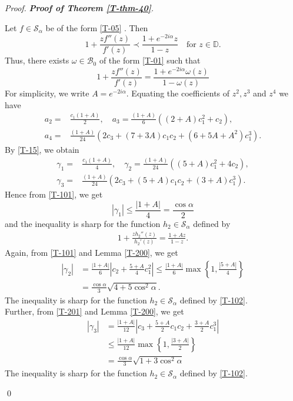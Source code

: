 \documentclass[a4paper,12pt]{amsart}
\theoremstyle{definition}
\newenvironment{pf}[1][]{%
 \vskip 3mm
 \noindent
 \ifthenelse{\equal{#1}{}}%
  {{\slshape Proof. }}%
  {{\slshape #1.} }%
 }%
{\qed\bigskip}
\begin{document}
\begin{pf}[\textbf{Proof of Theorem \ref{T-thm-40}}]
Let $ f \in \mathcal{S}_\alpha $ be of the form \eqref{T-05} . Then
$$
1 + \frac{zf''(z)}{f'(z)} \prec \frac{1+e^{-2i\alpha }z}{1-z} \quad \text{for } z \in \mathbb{D}.
$$  
Thus, there exists $\omega\in\mathcal{B}_0$ of the form \eqref{T-01} such that
$$
1 + \frac{zf''(z)}{f'(z)} =\frac{1+e^{-2i\alpha }\omega(z)}{1-\omega(z)} 
$$  
For simplicity, we write $A=e^{-2i\alpha }$. Equating the coefficients of $z^2,z^3$ and $z^4$ we have
    \begin{align*}
    a_2=&\frac{c_1(1+A)}{2}, \quad a_3=\frac{(1+A)}{6}\left((2+A)c_1^2+c_2\right),\\
    a_4= &\frac{(1+A)}{24}\left(2c_3+(7+3A)c_{1}c_{2}+(6+5A+A^2)c_1^3\right).
    \end{align*}
By \eqref{T-15}, we obtain
\begin{align}
    \gamma_1=&\frac{c_1(1+A)}{4}, \quad \gamma_2=\frac{(1+A)}{24}\left((5+A)c_1^2+4c_2\right),\label{T-101}\\
    \gamma_3= &\frac{(1+A)}{24}\left(2c_3+(5+A)c_{1}c_{2}+(3+A)c_1^3\right).\label{T-201}
    \end{align}
     Hence from \eqref{T-101}, we get
    $$
     |\gamma_1| \leq \frac{|1+A|}{4}= \frac{\cos\alpha}{2}
    $$
    and the inequality is sharp for the function $h_2\in\mathcal{S}_\alpha$ defined by
\begin{align}\label{T-102}
1 + \frac{zh_2''(z)}{h_2'(z)} =  \frac{1+Az}{1-z}.
\end{align}
Again, from \eqref{T-101} and Lemma \ref{T-200}, we get
\begin{align*}
|\gamma_2|
&= \frac{|1+A|}{6} \left|c_2+ \frac{5+A}{4}c_1^2 \right| \le \frac{|1+A|}{6} \max \left\{1, \frac{|5+A|}{4}\right\}\\
& =\frac{\cos\alpha}{3}\sqrt{4+5\cos^2\alpha}.
\end{align*}
The inequality is sharp for the function $h_2\in\mathcal{S}_\alpha$ defined by \eqref{T-102}.\\

Further, from \eqref{T-201} and Lemma \ref{T-200}, we get
\begin{align*}\label{T-104}
|\gamma_{3}|
&=\frac{|1+A|}{12} \left|c_3+\frac{5+A}{2}c_{1}c_{2}+\frac{3+A}{2}c_1^3\right|\\[2mm]
& \le \frac{|1+A|}{12} \max \left\{1, \frac{|3+A|}{2}\right\}\\[2mm]
&= \frac{\cos\alpha}{3}\sqrt{1+3\cos^2\alpha}
\end{align*}
The inequality is sharp for the function $h_2\in\mathcal{S}_\alpha$ defined by \eqref{T-102}.

\end{pf}
\end{document}
